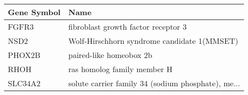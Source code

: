 \begin{tabular}{ll}
\toprule
Gene Symbol &                                               Name \\
\midrule
      FGFR3 &                fibroblast growth factor receptor 3 \\
       NSD2 &        Wolf-Hirschhorn syndrome candidate 1(MMSET) \\
     PHOX2B &                            paired-like homeobox 2b \\
       RHOH &                        ras homolog family member H \\
    SLC34A2 & solute carrier family 34 (sodium phosphate), me... \\
\bottomrule
\end{tabular}

